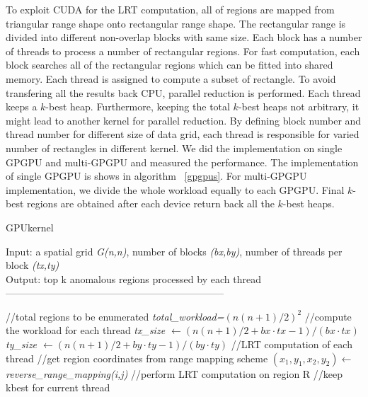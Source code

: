 \documentclass[AMA,LATO1COL]{WileyNJD-v2-bak}
\newcommand{\gpu}{\textsc{GPU}}
\begin{document}
To exploit CUDA for the LRT computation, all of regions are mapped from triangular range shape onto rectangular range shape. The rectangular range is divided into different non-overlap blocks with same size. Each block has a number of threads to process a number of rectangular regions. For fast computation, each block searches all of the rectangular regions which can be fitted into shared memory. Each thread is assigned to compute a subset of rectangle. To avoid transfering all the results back CPU, parallel reduction is performed. Each thread keeps a $k$-best heap. Furthermore, keeping the total $k$-best heaps not arbitrary, it might lead  to another kernel for parallel reduction. By defining block number and thread number for different size of data grid, each thread is responsible for varied number of rectangles in different kernel. We did the implementation on single GPGPU and multi-GPGPU and measured the performance.  The implementation of single GPGPU is shows in algorithm ~\ref{gpgpus}. For multi-GPGPU implementation, we divide the whole workload equally to each GPGPU. Final $k$-best regions are obtained after each device return back all the $k$-best heaps.

\begin{algorithm}[t!]
\label{al}
\caption{ \gpu kernel}\label{gpgpus}
Input: a spatial grid \textit{G(n,n)}, number of blocks \textit{(bx,by)}, number of threads per block \textit{(tx,ty)}\\
Output: top k anomalous regions processed by each thread\\
------------------------------------------------------------------ \\
\begin{algorithmic}[1]
\State //total regions to be enumerated
\State \textit {total\_workload=$(n(n+1)/2)^2$}
\State //compute the workload for each thread
\State \textit {tx\_size \(\leftarrow\)$(n(n+1)/2 +bx \cdot tx -1)/(bx\cdot tx)$ }
\State \textit {ty\_size \(\leftarrow\)$(n(n+1)/2 +by \cdot ty-1)/(by \cdot ty)$ }
\State //LRT computation of each thread
\State //get region coordinates from range mapping scheme
\State \textit { $(x_1,y_1,x_2,y_2)$\(\leftarrow\)reverse\_range\_mapping(i,j)}
\State //perform LRT computation on region R
\State //keep kbest for current thread

\EndFor
\EndFor
\end{algorithmic}
\end{algorithm}
\end{document}
